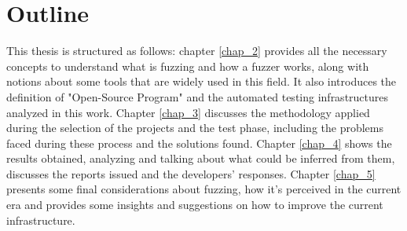 \section{Outline}
This thesis is structured as follows: chapter \ref{chap_2} provides all the necessary concepts to understand what is fuzzing and how a fuzzer works, along with notions about some tools that are widely used in this field. It also introduces the definition of "Open-Source Program" and the automated testing infrastructures analyzed in this work. Chapter \ref{chap_3} discusses the methodology applied during the selection of the projects and the test phase, including the problems faced during these process and the solutions found. Chapter \ref{chap_4} shows the results obtained, analyzing and talking about what could be inferred from them, discusses the reports issued and the developers' responses. Chapter \ref{chap_5} presents some final considerations about fuzzing, how it's perceived in the current era and provides some insights and suggestions on how to improve the current infrastructure.

